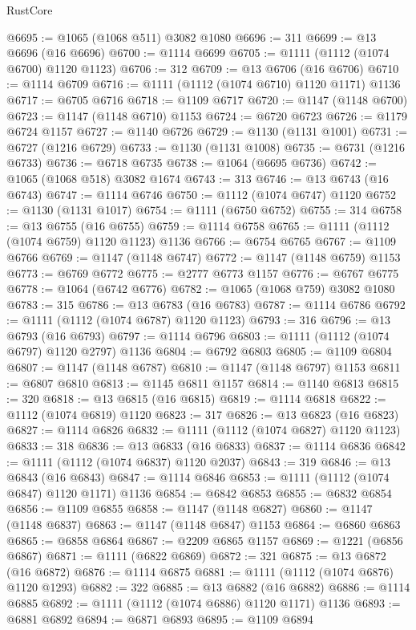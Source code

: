 \begin{lexlean}{RustCore}
\begin{coremodule}
@6695 := @1065 (@1068 @511) @3082 @1080
@6696 := 311
@6699 := @13 @6696 (@16 @6696)
@6700 := @1114 @6699
@6705 := @1111 (@1112 (@1074 @6700) @1120 @1123)
@6706 := 312
@6709 := @13 @6706 (@16 @6706)
@6710 := @1114 @6709
@6716 := @1111 (@1112 (@1074 @6710) @1120 @1171) @1136
@6717 := @6705 @6716
@6718 := @1109 @6717
@6720 := @1147 (@1148 @6700)
@6723 := @1147 (@1148 @6710) @1153
@6724 := @6720 @6723
@6726 := @1179 @6724 @1157
@6727 := @1140 @6726
@6729 := @1130 (@1131 @1001)
@6731 := @6727 (@1216 @6729)
@6733 := @1130 (@1131 @1008)
@6735 := @6731 (@1216 @6733)
@6736 := @6718 @6735
@6738 := @1064 (@6695 @6736)
@6742 := @1065 (@1068 @518) @3082 @1674
@6743 := 313
@6746 := @13 @6743 (@16 @6743)
@6747 := @1114 @6746
@6750 := @1112 (@1074 @6747) @1120
@6752 := @1130 (@1131 @1017)
@6754 := @1111 (@6750 @6752)
@6755 := 314
@6758 := @13 @6755 (@16 @6755)
@6759 := @1114 @6758
@6765 := @1111 (@1112 (@1074 @6759) @1120 @1123) @1136
@6766 := @6754 @6765
@6767 := @1109 @6766
@6769 := @1147 (@1148 @6747)
@6772 := @1147 (@1148 @6759) @1153
@6773 := @6769 @6772
@6775 := @2777 @6773 @1157
@6776 := @6767 @6775
@6778 := @1064 (@6742 @6776)
@6782 := @1065 (@1068 @759) @3082 @1080
@6783 := 315
@6786 := @13 @6783 (@16 @6783)
@6787 := @1114 @6786
@6792 := @1111 (@1112 (@1074 @6787) @1120 @1123)
@6793 := 316
@6796 := @13 @6793 (@16 @6793)
@6797 := @1114 @6796
@6803 := @1111 (@1112 (@1074 @6797) @1120 @2797) @1136
@6804 := @6792 @6803
@6805 := @1109 @6804
@6807 := @1147 (@1148 @6787)
@6810 := @1147 (@1148 @6797) @1153
@6811 := @6807 @6810
@6813 := @1145 @6811 @1157
@6814 := @1140 @6813
@6815 := 320
@6818 := @13 @6815 (@16 @6815)
@6819 := @1114 @6818
@6822 := @1112 (@1074 @6819) @1120
@6823 := 317
@6826 := @13 @6823 (@16 @6823)
@6827 := @1114 @6826
@6832 := @1111 (@1112 (@1074 @6827) @1120 @1123)
@6833 := 318
@6836 := @13 @6833 (@16 @6833)
@6837 := @1114 @6836
@6842 := @1111 (@1112 (@1074 @6837) @1120 @2037)
@6843 := 319
@6846 := @13 @6843 (@16 @6843)
@6847 := @1114 @6846
@6853 := @1111 (@1112 (@1074 @6847) @1120 @1171) @1136
@6854 := @6842 @6853
@6855 := @6832 @6854
@6856 := @1109 @6855
@6858 := @1147 (@1148 @6827)
@6860 := @1147 (@1148 @6837)
@6863 := @1147 (@1148 @6847) @1153
@6864 := @6860 @6863
@6865 := @6858 @6864
@6867 := @2209 @6865 @1157
@6869 := @1221 (@6856 @6867)
@6871 := @1111 (@6822 @6869)
@6872 := 321
@6875 := @13 @6872 (@16 @6872)
@6876 := @1114 @6875
@6881 := @1111 (@1112 (@1074 @6876) @1120 @1293)
@6882 := 322
@6885 := @13 @6882 (@16 @6882)
@6886 := @1114 @6885
@6892 := @1111 (@1112 (@1074 @6886) @1120 @1171) @1136
@6893 := @6881 @6892
@6894 := @6871 @6893
@6895 := @1109 @6894

\end{coremodule}
\end{lexlean}
